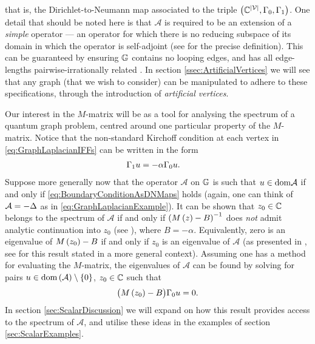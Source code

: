 that is, the Dirichlet-to-Neumann map associated to the triple $\left( \mathbb{C}^{\left\lvert \mathcal{V} \right\rvert},\Gamma_0,\Gamma_1 \right)$.
One detail that should be noted here is that $\mathcal{A}$ is required to be an extension of a \emph{simple} operator --- an operator for which there is no reducing subspace of its domain in which the operator is self-adjoint (see \cite[Section 2.2]{ershova2014isospectrality} for the precise definition).
This can be guaranteed by ensuring $\mathbb{G}$ contains no looping edges, and has all edge-lengths pairwise-irrationally related \cite{ashurova2014simplicity}.
In section \ref{ssec:ArtificialVertices} we will see that any graph (that we wish to consider) can be manipulated to adhere to these specifications, through the introduction of \emph{artificial vertices}.

Our interest in the $M$-matrix will be as a tool for analysing the spectrum of a quantum graph problem, centred around one particular property of the $M$-matrix.
Notice that the non-standard Kirchoff condition at each vertex in \eqref{eq:GraphLaplacianIFFs} can be written in the form
\begin{align} \label{eq:BoundaryConditionAsDNMaps}
	\Gamma_1 u &= -\alpha\Gamma_0 u.
\end{align}
Suppose more generally now that the operator $\mathcal{A}$ on $\mathbb{G}$ is such that $u\in\mathrm{dom}\mathcal{A}$ if and only if \eqref{eq:BoundaryConditionAsDNMaps} holds (again, one can think of $\mathcal{A}=-\Delta$ as in \eqref{eq:GraphLaplacianExample}).
It can be shown that $z_0\in\mathbb{C}$ belongs to the spectrum of $\mathcal{A}$ if and only if $\left( M\left( z \right) - B \right)^{-1}$ does \emph{not} admit analytic continuation into $z_0$ (see \cite[Theorem 2.1]{ershova2014isospectrality}), where $B=-\alpha$.
Equivalently, zero is an eigenvalue of $M\left( z_0 \right)-B$ if and only if $z_0$ is an eigenvalue of $\mathcal{A}$ (as presented in \cite[page 698]{cherednichenko2019time}, see \cite[Proposition 1]{derkach1991generalized} for this result stated in a more general context).
Assuming one has a method for evaluating the $M$-matrix, the eigenvalues of $\mathcal{A}$ can be found by solving for pairs $u\in\mathrm{dom}\left( \mathcal{A} \right)\setminus\left\{ 0 \right\}$, $z_0\in\mathbb{C}$ such that
\begin{align*}
	\bigl( M\left( z_0 \right) - B \bigr) \Gamma_0 u = 0.
\end{align*}
In section \ref{sec:ScalarDiscussion} we will expand on how this result provides access to the spectrum of $\mathcal{A}$, and utilise these ideas in the examples of section \ref{sec:ScalarExamples}.

